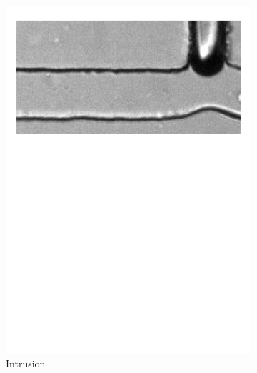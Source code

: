 \begin{figure}[h!]
	\begin{subfigure}{0.249\linewidth}
		\centering
		\includegraphics[page=4,clip,trim={10mm 190mm 00mm 20mm},width=\linewidth]{Ressourcen/PinchOff/Squeezing}
		\caption{Intrusion}
		\label{fig:fluidics:droplet:squeezing:intrusion}
	\end{subfigure}
	\hfil
	\begin{subfigure}{0.24\linewidth}
		\centering

\end{subfigure}
\end{figure}
